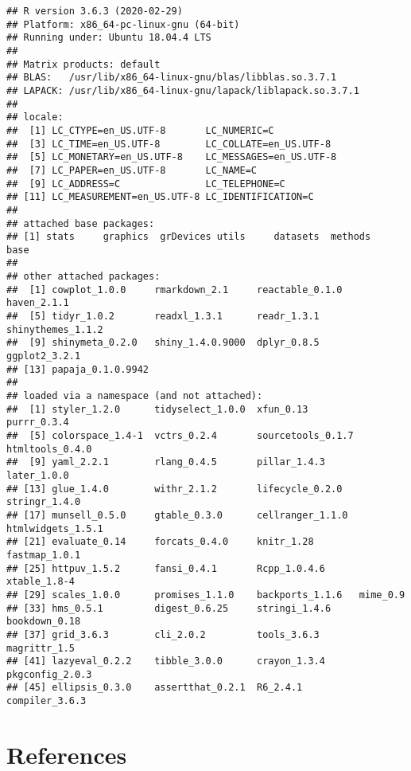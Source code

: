 \documentclass[english,man,floatsintext]{apa6}
\begin{document}
\begin{verbatim}
## R version 3.6.3 (2020-02-29)
## Platform: x86_64-pc-linux-gnu (64-bit)
## Running under: Ubuntu 18.04.4 LTS
## 
## Matrix products: default
## BLAS:   /usr/lib/x86_64-linux-gnu/blas/libblas.so.3.7.1
## LAPACK: /usr/lib/x86_64-linux-gnu/lapack/liblapack.so.3.7.1
## 
## locale:
##  [1] LC_CTYPE=en_US.UTF-8       LC_NUMERIC=C              
##  [3] LC_TIME=en_US.UTF-8        LC_COLLATE=en_US.UTF-8    
##  [5] LC_MONETARY=en_US.UTF-8    LC_MESSAGES=en_US.UTF-8   
##  [7] LC_PAPER=en_US.UTF-8       LC_NAME=C                 
##  [9] LC_ADDRESS=C               LC_TELEPHONE=C            
## [11] LC_MEASUREMENT=en_US.UTF-8 LC_IDENTIFICATION=C       
## 
## attached base packages:
## [1] stats     graphics  grDevices utils     datasets  methods   base     
## 
## other attached packages:
##  [1] cowplot_1.0.0     rmarkdown_2.1     reactable_0.1.0   haven_2.1.1      
##  [5] tidyr_1.0.2       readxl_1.3.1      readr_1.3.1       shinythemes_1.1.2
##  [9] shinymeta_0.2.0   shiny_1.4.0.9000  dplyr_0.8.5       ggplot2_3.2.1    
## [13] papaja_0.1.0.9942
## 
## loaded via a namespace (and not attached):
##  [1] styler_1.2.0      tidyselect_1.0.0  xfun_0.13         purrr_0.3.4      
##  [5] colorspace_1.4-1  vctrs_0.2.4       sourcetools_0.1.7 htmltools_0.4.0  
##  [9] yaml_2.2.1        rlang_0.4.5       pillar_1.4.3      later_1.0.0      
## [13] glue_1.4.0        withr_2.1.2       lifecycle_0.2.0   stringr_1.4.0    
## [17] munsell_0.5.0     gtable_0.3.0      cellranger_1.1.0  htmlwidgets_1.5.1
## [21] evaluate_0.14     forcats_0.4.0     knitr_1.28        fastmap_1.0.1    
## [25] httpuv_1.5.2      fansi_0.4.1       Rcpp_1.0.4.6      xtable_1.8-4     
## [29] scales_1.0.0      promises_1.1.0    backports_1.1.6   mime_0.9         
## [33] hms_0.5.1         digest_0.6.25     stringi_1.4.6     bookdown_0.18    
## [37] grid_3.6.3        cli_2.0.2         tools_3.6.3       magrittr_1.5     
## [41] lazyeval_0.2.2    tibble_3.0.0      crayon_1.3.4      pkgconfig_2.0.3  
## [45] ellipsis_0.3.0    assertthat_0.2.1  R6_2.4.1          compiler_3.6.3
\end{verbatim}

\newpage

\hypertarget{references}{%
\section{References}\label{references}}

\begingroup
\setlength{\parindent}{-0.5in}
\setlength{\leftskip}{0.5in}
\end{document}
